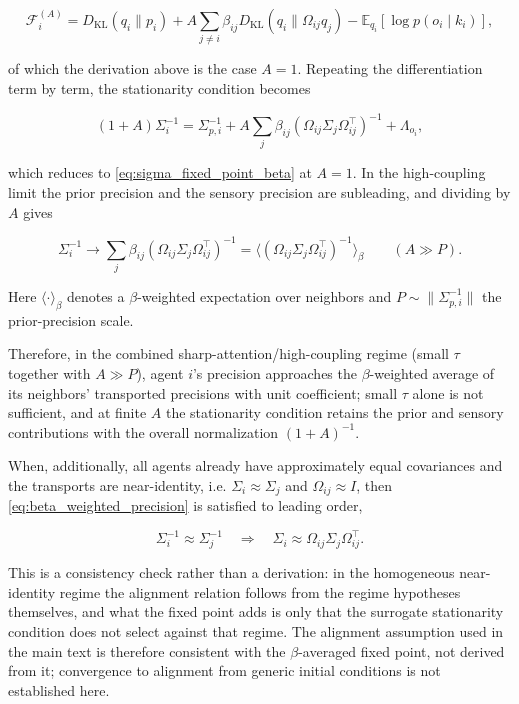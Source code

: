 \documentclass[11pt]{article}
\begin{document}
\begin{equation}
\mathcal{F}_i^{(A)}
=D_{\mathrm{KL}}(q_i \| p_i)
+ A \sum_{j \neq i} \beta_{ij}
D_{\mathrm{KL}}(q_i \| \Omega_{ij} q_j)
- \mathbb{E}_{q_i}[\log p(o_i \mid k_i)],
\end{equation}

of which the derivation above is the case $A = 1$. Repeating the differentiation term by term, the stationarity condition becomes

\begin{equation}
(1 + A)\Sigma_i^{-1}
=\Sigma_{p,i}^{-1}
+ A \sum_j \beta_{ij}
(\Omega_{ij}\Sigma_j\Omega_{ij}^\top)^{-1}
+ \Lambda_{o_i},
\end{equation}

which reduces to \eqref{eq:sigma_fixed_point_beta} at $A = 1$. In the high-coupling limit the prior precision and the sensory precision are subleading, and dividing by $A$ gives

\begin{equation}
\boxed{
\Sigma_i^{-1}
\longrightarrow
\sum_j \beta_{ij}
(\Omega_{ij}\Sigma_j\Omega_{ij}^\top)^{-1}
=\big\langle(\Omega_{ij}\Sigma_j\Omega_{ij}^\top)^{-1}
\big\rangle_{\beta}
\qquad (A \gg P).}
\label{eq:beta_weighted_precision}
\end{equation}

Here $\langle \cdot \rangle_{\beta}$ denotes a $\beta$-weighted expectation over neighbors and $P \sim \|\Sigma_{p,i}^{-1}\|$ the prior-precision scale.

Therefore, in the combined sharp-attention/high-coupling regime (small $\tau$ together with $A \gg P$), agent $i$'s precision approaches the $\beta$-weighted average of its neighbors' transported precisions with unit coefficient; small $\tau$ alone is not sufficient, and at finite $A$ the stationarity condition retains the prior and sensory contributions with the overall normalization $(1+A)^{-1}$.

When, additionally, all agents already have approximately equal covariances and the transports are near-identity, i.e. $\Sigma_i \approx \Sigma_j$ and $\Omega_{ij} \approx I$, then \eqref{eq:beta_weighted_precision} is satisfied to leading order,

\begin{equation}
\Sigma_i^{-1} \approx \Sigma_j^{-1}
\quad\Longrightarrow\quad
\Sigma_i \approx \Omega_{ij}\Sigma_j\Omega_{ij}^\top.
\end{equation}

This is a consistency check rather than a derivation: in the homogeneous near-identity regime the alignment relation follows from the regime hypotheses themselves, and what the fixed point adds is only that the surrogate stationarity condition does not select against that regime. The alignment assumption used in the main text is therefore consistent with the $\beta$-averaged fixed point, not derived from it; convergence to alignment from generic initial conditions is not established here.
\end{document}
